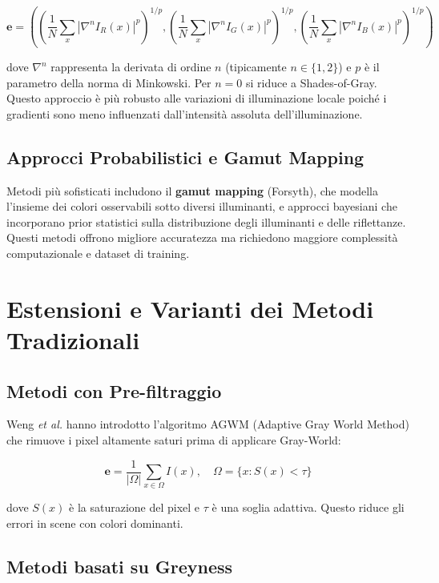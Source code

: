 \begin{equation}
\mathbf{e} = \left( \left( \frac{1}{N} \sum_{x} |\nabla^n I_R(x)|^p \right)^{1/p}, \left( \frac{1}{N} \sum_{x} |\nabla^n I_G(x)|^p \right)^{1/p}, \left( \frac{1}{N} \sum_{x} |\nabla^n I_B(x)|^p \right)^{1/p} \right)
\label{eq:gray_edge}
\end{equation}

dove $\nabla^n$ rappresenta la derivata di ordine $n$ (tipicamente $n \in \{1, 2\}$) e $p$ è il parametro della norma di Minkowski. Per $n = 0$ si riduce a Shades-of-Gray. Questo approccio è più robusto alle variazioni di illuminazione locale poiché i gradienti sono meno influenzati dall'intensità assoluta dell'illuminazione.

\subsection{Approcci Probabilistici e Gamut Mapping}

Metodi più sofisticati includono il \textbf{gamut mapping} (Forsyth), che modella l'insieme dei colori osservabili sotto diversi illuminanti, e approcci bayesiani \cite{gehler_bayesian_2008} che incorporano prior statistici sulla distribuzione degli illuminanti e delle riflettanze. Questi metodi offrono migliore accuratezza ma richiedono maggiore complessità computazionale e dataset di training.

\section{Estensioni e Varianti dei Metodi Tradizionali}

\subsection{Metodi con Pre-filtraggio}

Weng \textit{et al.} \cite{weng_novel_2005} hanno introdotto l'algoritmo AGWM (Adaptive Gray World Method) che rimuove i pixel altamente saturi prima di applicare Gray-World:

\begin{equation}
\mathbf{e} = \frac{1}{|\Omega|} \sum_{x \in \Omega} I(x), \quad \Omega = \{x : S(x) < \tau\}
\end{equation}

dove $S(x)$ è la saturazione del pixel e $\tau$ è una soglia adattiva. Questo riduce gli errori in scene con colori dominanti.

\subsection{Metodi basati su Greyness}

